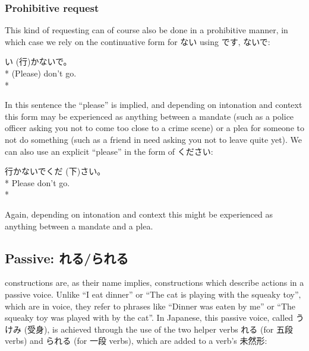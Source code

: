 \documentclass[11pt, b5paper, twoside, openright, onecolumn]{book}
\makeatletter
\newcommand*{\rubystack}[2]{{\relscale{0.5}%
  \begin{tabular}[b]{@{}c@{}}%
    {#1}\\%
   {\textscale{2}{#2}}%
  \end{tabular}}%
}
\DeclareRobustCommand*{\ruby}[2]{%
  \mbox{%
    \setlength{\parskip}{0ex}%
    \BeginAccSupp{method=pdfstringdef,ActualText={#1}}%
      \rubystack{\phantom{#2}}{#1}%
      \llap{%
        \rubystack{#2}{\phantom{#1}}%
      }%
    \EndAccSupp{}%
  }%
}
\renewcommand*{\ruby}[2]{#2 (#1)}%
\newenvironment{exampleblock}{
\setlength{\parindent}{0.6in}
\begin{minipage}[t]{\dimexpr\textwidth-\parindent}}
{\end{minipage}}
\makeatother
\begin{document}
\subsubsection{Prohibitive request}

This kind of requesting can of course also be done in a prohibitive manner‚ in which case we rely on the continuative form for ない using です‚ ないで:

\vspace{0.4cm}
\begin{exampleblock}
\ruby{行}{い}かないで。 \\* 
(Please) don’t go. \\* 
\end{exampleblock}
\vspace{0.2cm}

In this sentence the “please” is implied‚ and depending on intonation and context this form may be experienced as anything between a mandate (such as a police officer asking you not to come too close to a crime scene) or a plea for someone to not do something (such as a friend in need asking you not to leave quite yet). We can also use an explicit “please” in the form of ください:

\vspace{0.4cm}
\begin{exampleblock}
行かないで\ruby{下}{くだ}さい。 \\* 
Please don’t go. \\* 
\end{exampleblock}
\vspace{0.2cm}

Again‚ depending on intonation and context this might be experienced as anything between a mandate and a plea.

\subsection{Passive: れる/られる}

 constructions are‚ as their name implies‚ constructions which describe actions in a passive voice. Unlike “I eat dinner” or “The cat is playing with the squeaky toy”‚ which are in  voice‚ they refer to phrases like “Dinner was eaten by me” or “The squeaky toy was played with by the cat”. In Japanese‚ this passive voice‚ called \ruby{受身}{うけみ}‚ is achieved through the use of the two helper verbs れる (for 五段 verbs) and られる (for 一段 verbs)‚ which are added to a verb’s 未然形:
\end{document}

